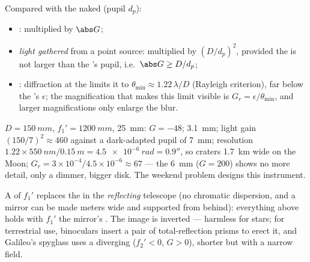 \begin{proposition}\label{prop:b1:optical-instruments:gains}
Compared with the naked  (pupil $d_p$):
\begin{itemize}
  \item \emph{}: multiplied by $\abs G$;
  \item \emph{light gathered} from a point source: multiplied by
        $(D/d_p)^2$, provided the  is not larger than the
        's pupil, i.e.\ $\abs G \geq D/d_p$;
  \item \emph{}: diffraction at the  limits
        it to $\theta_{\min} \approx 1.22\,\lambda/D$ (Rayleigh
        criterion), far below the 's $\epsilon$; the magnification
        that makes this limit visible is $G_r = \epsilon/\theta_{\min}$,
        and larger magnifications only enlarge the blur.
\end{itemize}
\end{proposition}
\admitted

\begin{example}\label{ex:b1:optical-instruments:telnum}
$D = \qty{150}{mm}$, $f_1' = \qty{1200}{mm}$,  \qty{25}{mm}:
$G = -48$;  \qty{3.1}{mm}; light gain $(150/7)^2 \approx
460$ against a dark-adapted pupil of \qty{7}{mm}; resolution $1.22 \times
\qty{550}{nm}/\qty{0.15}{m} = \qty{4.5e-6}{rad} = 0.9''$, so
craters \qty{1.7}{km} wide on the Moon; $G_r = 3\times10^{-4}/4.5\times
10^{-6} \approx 67$ --- the \qty{6}{mm}  ($G = 200$) shows no
more detail, only a dimmer, bigger disk. The weekend problem designs
this instrument.
\end{example}

\begin{remark}\label{rem:b1:optical-instruments:variants}
A  of  $f_1'$ replaces the   in
the \emph{reflecting} telescope (no chromatic dispersion, and a mirror
can be made meters wide and supported from behind): everything above
holds with $f_1'$ the mirror's . The image is inverted ---
harmless for stars; for terrestrial use, binoculars insert a pair of
total-reflection prisms to erect it, and Galileo's spyglass uses a
diverging  ($f_2' < 0$, $G > 0$), shorter but with a narrow
field.
\end{remark}

